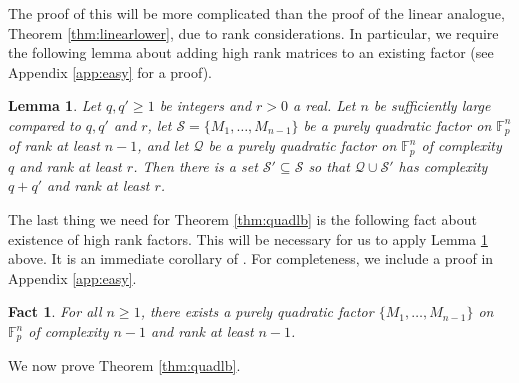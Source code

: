 \documentclass[12pt,oneside,british,a4wide]{amsart}
\newtheorem{lemma}[theorem]{Lemma}
\newtheorem{fact}[theorem]{Fact}
\numberwithin{equation}{section}
\theoremstyle{definition}
\def\F{\mathbb{F}}
\newcommand{\calQ}{\mathcal{Q}}
\newcommand{\calS}{\mathcal{S}}
\begin{document}
The proof of this will be more complicated than the proof of the linear analogue, Theorem \ref{thm:linearlower}, due to rank considerations.  In particular, we require the following lemma about adding high rank matrices to an existing factor (see Appendix \ref{app:easy} for a proof). 


\begin{lemma}\label{lem:padding}
Let $q,q'\geq 1$ be integers and $r>0$ a real.  Let $n$ be sufficiently large compared to $q,q'$ and $r$, let $\calS=\{M_1,\ldots, M_{n-1}\}$ be a purely quadratic factor on $\F_p^n$ of rank at least $n-1$, and let $\calQ$ be a purely quadratic factor on $\F_p^n$ of complexity $q$ and rank at least $r$.  Then there is a set $\calS'\subseteq \calS$ so that $\calQ\cup \calS'$ has complexity $q+q'$ and rank at least $r$.
\end{lemma}
 

\vspace{2mm}




The last thing we need for  Theorem \ref{thm:quadlb} is the following fact about existence of high rank factors. This will be necessary for us to apply Lemma \ref{lem:padding} above. It is an immediate corollary of  \cite[Lemma 3]{Dumas.2011}. For completeness, we include a proof in Appendix \ref{app:easy}.

\begin{fact}\label{fact:basis}
For all $n\geq 1$, there exists a purely quadratic factor $\{M_1,\ldots, M_{n-1}\}$ on $\F_p^n$ of complexity $n-1$ and rank at least $n-1$.
\end{fact}
 

We now prove  Theorem \ref{thm:quadlb}.

\vspace{2mm}
\end{document}
